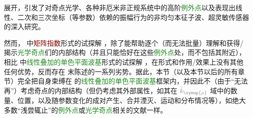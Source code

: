 展开\cite{xieAnalytic3DVector}，引发了对奇点光学\cite{berryOpticalSingularitiesBirefringent2003,berryOpticalSingularitiesBianisotropic2005,kirillovUnfoldingEigenvalueSurfaces2005}、各种非厄米\cite{yangNonabelianPhysicsLight2024}非正规\cite{wiersigDistanceExceptionalPoints2022}系统中的高阶\textcolor{ForestGreen}{例外点}\cite{mackayExceptionalGuidedWaves2021,wiersigMovingExceptionalSurface2023}以及表现出线性、二次和三次坐标（等参数）依赖的振幅行为的非均匀本征子波\cite{lakhtakiaElectromagneticSurfaceWaves2020,gerardinConditionsVoigtWave2001,borzdovWavesLinearQuadratic1996,sturmElectromagneticWavesCrystals2024}、超灵敏传感器\cite{wiersigReviewExceptionalPointbased2020,wiersigMovingExceptionalSurface2023}的深入研究。

然而， 中\textcolor{Maroon}{矩阵指数}形式的试探解 ，除了能帮助逐个（而无法批量）理解和获得/揭示\textcolor{ForestGreen}{光学奇点}们的内部结构（并且只能恰好在这些\textcolor{ForestGreen}{例外点}处，而不包括其附近），相比  中\textcolor{ForestGreen}{线性叠加的单色平面波基}形式的试探解 ，在形式和作用/效果上没有其他任何优势，反而存在  末陈述的一系列劣势。据此，本节（以及本节以后的所有章节）完全把自身束缚在  的\textcolor{ForestGreen}{线性叠加的单色平面波基}框架内，并因此不（由于“无法再”）考虑奇点的内部结构（但仍考虑其外部属性，如其在 $\mathcolor{gray}{\bar{k}_{\symup{\rho}}}$ 域中的数量、位置，以及随参数变化的成对产生、合并湮灭、运动和分布情况等），如绝大多数“浅尝辄止”的\textcolor{ForestGreen}{例外点}\cite{hernandezExceptionalPointsNonHermitian2011,hanExceptionalEntanglementPhenomena2023,baiObservationNonlinearExceptional2024,baiNonlinearExceptionalPoints2023}或\textcolor{ForestGreen}{光学奇点}\cite{richterExceptionalPointsAnisotropic2017,grundmannSingularOpticalAxes2016,berryOpticalSingularitiesBirefringent2003,berryOpticalSingularitiesBianisotropic2005,grundmannOpticallyAnisotropicMedia2017}相关的文献一样。

